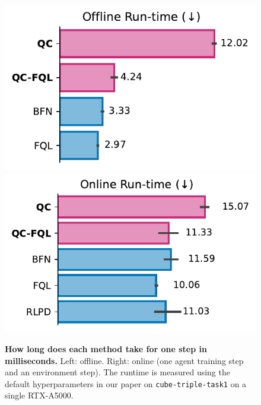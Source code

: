 \begin{figure}[H]
    \centering
\includegraphics[width=0.48\linewidth]{figures/run-time-offline.pdf}
\label{fig:run-time-offline}
\hfill
\includegraphics[width=0.48\linewidth]{figures/run-time-online.pdf}
\caption{\footnotesize \textbf{How long does each method take for one step in milliseconds.} Left: offline. Right: online (one agent training step and an environment step). The runtime is measured using the default hyperparameters in our paper on \texttt{cube-triple-task1} on a single RTX-A5000.}
\label{fig:run-time}
\end{figure}



